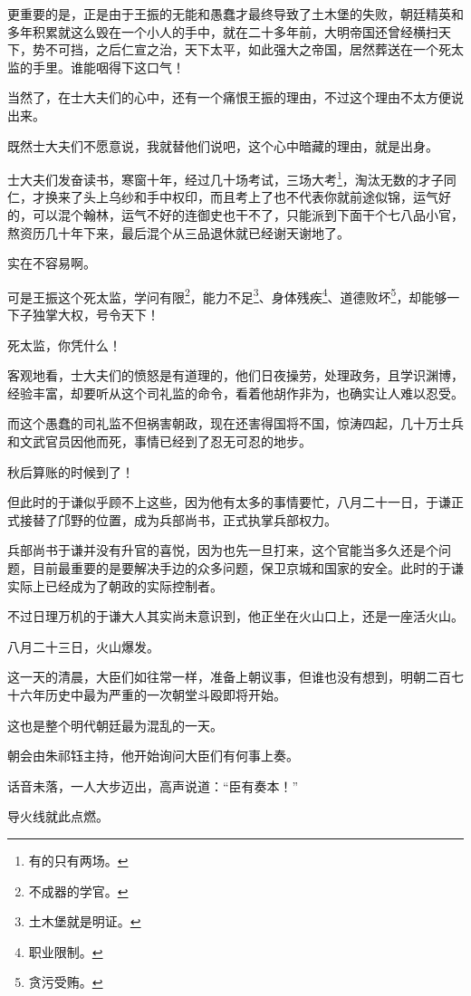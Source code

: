 \begin{multicols}{\theparacolNo}
更重要的是，正是由于王振的无能和愚蠢才最终导致了土木堡的失败，朝廷精英和多年积累就这么毁在一个小人的手中，就在二十多年前，大明帝国还曾经横扫天下，势不可挡，之后仁宣之治，天下太平，如此强大之帝国，居然葬送在一个死太监的手里。谁能咽得下这口气！

当然了，在士大夫们的心中，还有一个痛恨王振的理由，不过这个理由不太方便说出来。

既然士大夫们不愿意说，我就替他们说吧，这个心中暗藏的理由，就是出身。

士大夫们发奋读书，寒窗十年，经过几十场考试，三场大考\footnote{有的只有两场。}，淘汰无数的才子同仁，才换来了头上乌纱和手中权印，而且考上了也不代表你就前途似锦，运气好的，可以混个翰林，运气不好的连御史也干不了，只能派到下面干个七八品小官，熬资历几十年下来，最后混个从三品退休就已经谢天谢地了。

实在不容易啊。

可是王振这个死太监，学问有限\footnote{不成器的学官。}，能力不足\footnote{土木堡就是明证。}、身体残疾\footnote{职业限制。}、道德败坏\footnote{贪污受贿。}，却能够一下子独掌大权，号令天下！

死太监，你凭什么！

客观地看，士大夫们的愤怒是有道理的，他们日夜操劳，处理政务，且学识渊博，经验丰富，却要听从这个司礼监的命令，看着他胡作非为，也确实让人难以忍受。

而这个愚蠢的司礼监不但祸害朝政，现在还害得国将不国，惊涛四起，几十万士兵和文武官员因他而死，事情已经到了忍无可忍的地步。

秋后算账的时候到了！

但此时的于谦似乎顾不上这些，因为他有太多的事情要忙，八月二十一日，于谦正式接替了邝野的位置，成为兵部尚书，正式执掌兵部权力。

兵部尚书于谦并没有升官的喜悦，因为也先一旦打来，这个官能当多久还是个问题，目前最重要的是要解决手边的众多问题，保卫京城和国家的安全。此时的于谦实际上已经成为了朝政的实际控制者。

不过日理万机的于谦大人其实尚未意识到，他正坐在火山口上，还是一座活火山。

八月二十三日，火山爆发。

这一天的清晨，大臣们如往常一样，准备上朝议事，但谁也没有想到，明朝二百七十六年历史中最为严重的一次朝堂斗殴即将开始。

这也是整个明代朝廷最为混乱的一天。

朝会由朱祁钰主持，他开始询问大臣们有何事上奏。

话音未落，一人大步迈出，高声说道：“臣有奏本！”

导火线就此点燃。


\end{multicols}
